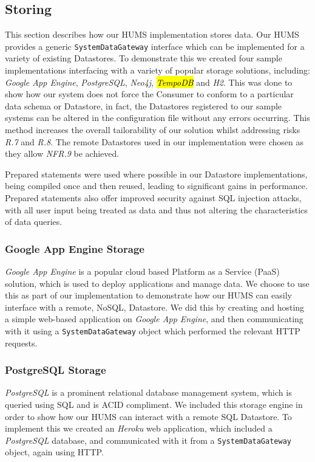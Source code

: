 \documentclass[10pt,a4paper]{article}
\begin{document}
\subsection{Storing}
\label{sec:store}
This section describes how our HUMS implementation stores data. Our HUMS provides a generic \texttt{SystemDataGateway} interface which can be implemented for a variety of existing Datastores. To demonstrate this we created four sample implementations interfacing with a variety of popular storage solutions, including: \emph{Google App Engine}, \emph{PostgreSQL}, \emph{Neo4j}, \hl{\emph{TempoDB}} and \emph{H2}. This was done to show how our system does not force the Consumer to conform to a particular data schema or Datastore, in fact, the Datastores registered to our sample systems can be altered in the configuration file without any errors occurring. This method increases the overall tailorability of our solution whilst addressing risks \emph{R.7} and \emph{R.8}. The remote Datastores used in our implementation were chosen as they allow \emph{NFR.9} be achieved.

Prepared statements were used where possible in our Datastore implementations, being compiled once and then reused, leading to significant gains in performance. Prepared statements also offer improved security against SQL injection attacks, with all user input being treated as data and thus not altering the characteristics of data queries.

\subsubsection{Google App Engine Storage}
\emph{Google App Engine} is a popular cloud based Platform as a Service (PaaS) solution, which is used to deploy applications and manage data. We choose to use this as part of our implementation to demonstrate how our HUMS can easily interface with a remote, NoSQL, Datastore. We did this by creating and hosting a simple web-based application on \emph{Google App Engine}, and then communicating with it using a \texttt{SystemDataGateway} object which performed the relevant HTTP requests.  

\subsubsection{PostgreSQL Storage}
\emph{PostgreSQL} is a prominent relational database management system, which is queried using SQL and is ACID compliment. We included this storage engine in order to show how our HUMS can interact with a remote SQL Datastore. 
To implement this we created an \emph{Heroku} web application, which included a \emph{PostgreSQL} database, and communicated with it from a \texttt{SystemDataGateway} object, again using HTTP.
\end{document}
